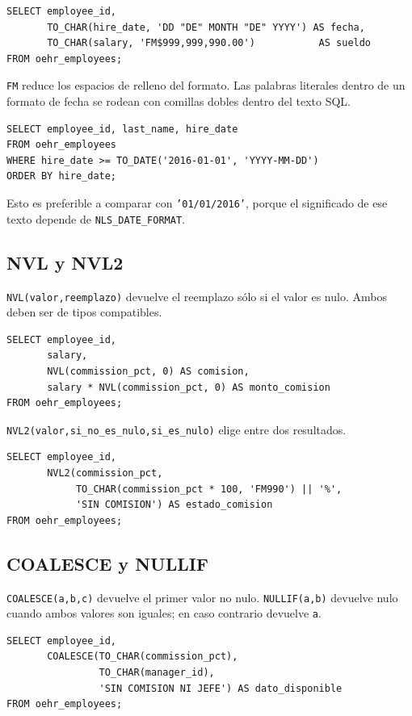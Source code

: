 \documentclass[11pt,a4paper]{article}
\newcommand{\campo}[1]{\texttt{#1}}
\begin{document}
\begin{lstlisting}
SELECT employee_id,
       TO_CHAR(hire_date, 'DD "DE" MONTH "DE" YYYY') AS fecha,
       TO_CHAR(salary, 'FM$999,999,990.00')           AS sueldo
FROM oehr_employees;
\end{lstlisting}

\campo{FM} reduce los espacios de relleno del formato. Las palabras literales dentro de un formato de
fecha se rodean con comillas dobles dentro del texto SQL.

\begin{lstlisting}
SELECT employee_id, last_name, hire_date
FROM oehr_employees
WHERE hire_date >= TO_DATE('2016-01-01', 'YYYY-MM-DD')
ORDER BY hire_date;
\end{lstlisting}

Esto es preferible a comparar con \campo{'01/01/2016'}, porque el significado de ese texto depende de
\campo{NLS\_DATE\_FORMAT}.

\subsection{NVL y NVL2}

\campo{NVL(valor,reemplazo)} devuelve el reemplazo sólo si el valor es nulo. Ambos deben ser de tipos
compatibles.

\begin{lstlisting}
SELECT employee_id,
       salary,
       NVL(commission_pct, 0) AS comision,
       salary * NVL(commission_pct, 0) AS monto_comision
FROM oehr_employees;
\end{lstlisting}

\campo{NVL2(valor,si_no_es_nulo,si_es_nulo)} elige entre dos resultados.

\begin{lstlisting}
SELECT employee_id,
       NVL2(commission_pct,
            TO_CHAR(commission_pct * 100, 'FM990') || '%',
            'SIN COMISION') AS estado_comision
FROM oehr_employees;
\end{lstlisting}

\subsection{COALESCE y NULLIF}

\campo{COALESCE(a,b,c)} devuelve el primer valor no nulo. \campo{NULLIF(a,b)} devuelve nulo cuando
ambos valores son iguales; en caso contrario devuelve \campo{a}.

\begin{lstlisting}
SELECT employee_id,
       COALESCE(TO_CHAR(commission_pct),
                TO_CHAR(manager_id),
                'SIN COMISION NI JEFE') AS dato_disponible
FROM oehr_employees;
\end{lstlisting}
\end{document}
